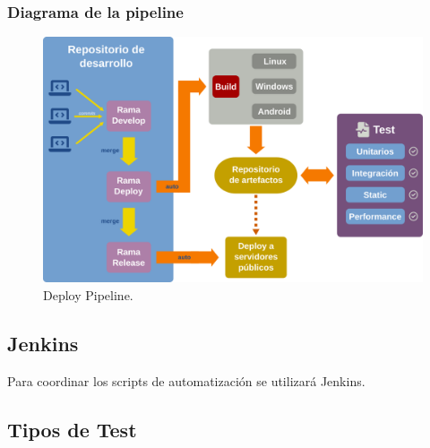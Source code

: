 \subsubsection{Diagrama de la pipeline}\label{pipeline:diagrama-pipeline}

\begin{figure}[ht]
	\centering
	\includegraphics[width=\textwidth]{images/pipeline.png}
	\caption{Deploy Pipeline.}
\end{figure}

\subsection{Jenkins}

Para coordinar los scripts de automatización se utilizará Jenkins.


\subsection{Tipos de Test}\label{pipeline:tipos-de-test}

